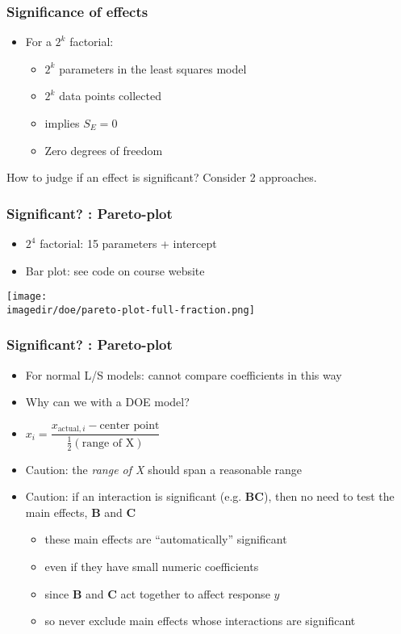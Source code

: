 \begin{frame}\frametitle{Significance of effects}
	\begin{itemize}
		\item	For a $2^k$ factorial:
		\begin{itemize}
			\item	$2^k$ parameters in the least squares model
			\item	$2^k$ data points collected
			\item	implies $S_E = 0$
			\item	Zero degrees of freedom
		\end{itemize}
	\end{itemize}

	How to judge if an effect is significant? Consider 2 approaches.
\end{frame}

\begin{frame}\frametitle{Significant? : Pareto-plot}
	\begin{itemize}
		\item	$2^4$ factorial: 15 parameters + intercept
		\item	Bar plot: see code on course website
	\end{itemize}
	\begin{center}
		\texttt{[image: \\imagedir/doe/pareto-plot-full-fraction.png]}
	\end{center}
\end{frame}

\begin{frame}\frametitle{Significant? : Pareto-plot}
	\begin{itemize}
		\item	For normal L/S models: cannot compare coefficients in this way
		\item	Why can we with a DOE model?
		\item	$x_i = \dfrac{x_{\text{actual}, i}- \text{center point}}{\frac{1}{2} (\text{range of X})}$
		\item	Caution: the \emph{range of X} should span a reasonable range
	\end{itemize}
	\begin{itemize}
		\item	Caution: if an interaction is significant (e.g. \textbf{BC}), then no need to test the main effects, \textbf{B} and \textbf{C}
		\begin{itemize}
			\item	these main effects are ``automatically'' significant
			\item	even if they have small numeric coefficients
			\item	since \textbf{B} and \textbf{C} act together to affect response $y$
			\item	so never exclude main effects whose interactions are significant
		\end{itemize}
	\end{itemize}
\end{frame}


